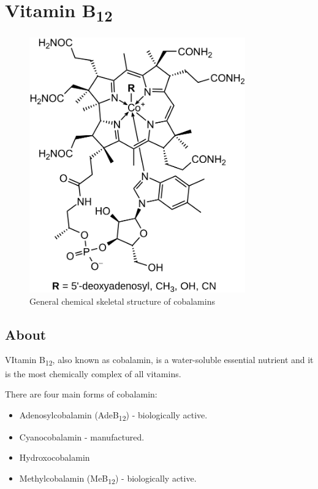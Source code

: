 \documentclass{book}
\begin{document}
\begin{sloppypar}
\chapter{Vitamin B\texorpdfstring{\textsubscript{12}}{12}}
\begin{figure}[h]
	\caption{General chemical skeletal structure of cobalamins}
	\centering \includegraphics[width=0.83\textwidth]{images/Vitamin_B12_chemical_structure}
\end{figure}
\newpage

\section{About}
VItamin B\textsubscript{12}, also known as cobalamin, is a water-soluble essential nutrient and it is the most chemically complex of all vitamins.

There are four main forms of cobalamin:
\begin{itemize}
	\item Adenosylcobalamin (AdeB\textsubscript{12}) - biologically active.
	\item Cyanocobalamin - manufactured.
	\item Hydroxocobalamin
	\item Methylcobalamin (MeB\textsubscript{12}) - biologically active.
\end{itemize}


\end{sloppypar}
\end{document}
